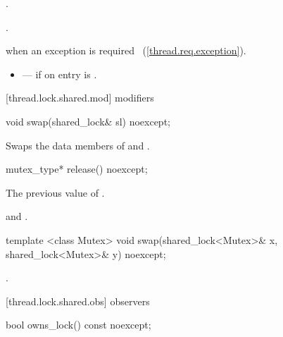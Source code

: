 \begin{itemdescr}
\pnum
\effects {}.

\pnum
\postconditions {}.

\pnum
\throws {} when an exception is required ~(\ref{thread.req.exception}).

\pnum
\errors
\begin{itemize}
\item {} --- if on entry  is
.
\end{itemize}
\end{itemdescr}

[thread.lock.shared.mod]{ modifiers}

%
%
\begin{itemdecl}
void swap(shared_lock& sl) noexcept;
\end{itemdecl}

\begin{itemdescr}
\pnum
\effects Swaps the data members of  and .
\end{itemdescr}

%
%
\begin{itemdecl}
mutex_type* release() noexcept;
\end{itemdecl}

\begin{itemdescr}
\pnum
\returns The previous value of .

\pnum
\postconditions {} and .
\end{itemdescr}

%
%
\begin{itemdecl}
template <class Mutex>
  void swap(shared_lock<Mutex>& x, shared_lock<Mutex>& y) noexcept;
\end{itemdecl}

\begin{itemdescr}
\pnum
\effects {}.
\end{itemdescr}

[thread.lock.shared.obs]{ observers}

%
%
\begin{itemdecl}
bool owns_lock() const noexcept;
\end{itemdecl}

